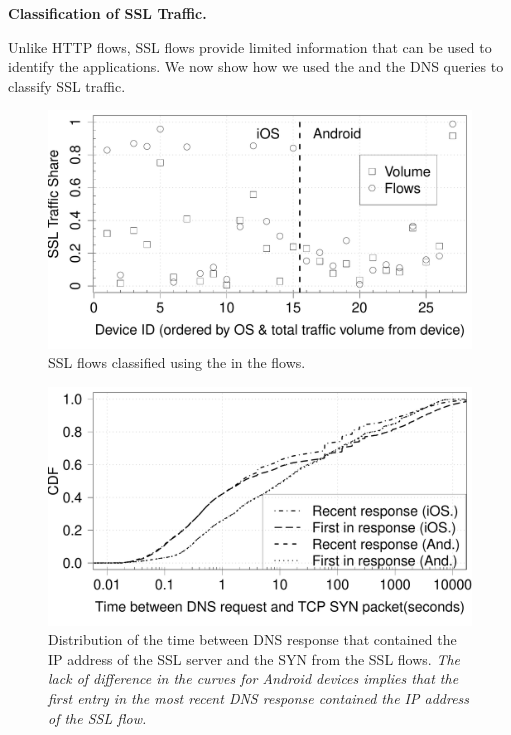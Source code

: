 \textbf{Classification of SSL Traffic.}

Unlike HTTP flows, SSL flows provide limited information that can be used to identify the applications. 
We now show how we used the \sslservername and the DNS queries to classify SSL traffic. 

\begin{figure}
\includegraphics[width=\columnwidth]{plots/sslanalysis_someservername_traffic.pdf}
\caption{SSL flows classified using the \sslservername in the flows.}
\label{fig:ssl-classification-servername}
\end{figure}


\begin{figure}
\includegraphics[width=\columnwidth]{plots/sslanalysis_dns_timediff_distrib.pdf}
\caption{Distribution of the time between DNS response that contained the IP address of the SSL server and the SYN from the SSL flows. 
\emph{The lack of difference in the curves for Android devices implies that the first entry in the most recent DNS response contained the IP address of the SSL flow.}}
\label{fig:ssl-dns-first-recent-distrib}
\end{figure}

